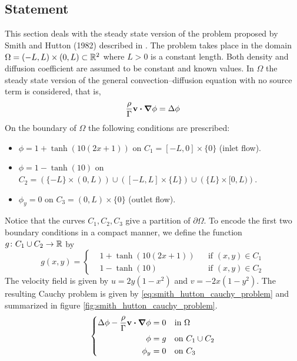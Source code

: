 
\subsection{Statement}

This section deals with the steady state version of the problem proposed by
Smith and Hutton (1982) described in \cite{smith1982numerical}. The problem
takes place in the domain $\Omega = (-L,L) \times (0,L) \subset \mathbb{R}^2$ where
$L > 0$ is a constant length. Both density and diffusion coefficient are assumed
to be constant and known values. In $\Omega$ the steady state version of the
general convection--diffusion equation with no source term is considered, that
is,
\begin{equation*}
	\frac{\rho}{\Gamma} \vb{v} \vdot \grad{\phi} = \Delta{\phi}
\end{equation*}
On the boundary of $\Omega$ the following conditions are prescribed:
\begin{itemize}[topsep=0pt]
	\item $\phi = 1 + \tanh(10(2x+1))$ on $C_1 = [-L,0] \times \{ 0 \}$ (inlet
	flow).
	\item $\phi = 1 - \tanh(10)$ on $C_2 = \left( \{ -L \} \times (0,L) \right)
	\cup \left( [-L,L] \times \{ L \} \right) \cup \left( \{ L \} \times [0,L)
	\right)$.
	\item $\phi_y = 0$ on $C_3 = (0,L) \times \{ 0
	\}$ (outlet flow).
\end{itemize}
Notice that the curves $C_1, C_2, C_3$ give a partition of $\partial \Omega$. To
encode the first two boundary conditions in a compact manner, we define the
function $g \colon C_1 \cup C_2 \rightarrow \mathbb{R}$ by
\begin{equation*}
	g(x,y) = 
	\left\{
	\begin{aligned}
		&1 + \tanh(10(2x + 1)) 	& &\text{if } (x,y) \in C_1 \\
		&1 - \tanh(10) 			& &\text{if } (x,y) \in C_2
	\end{aligned}
	\right.
\end{equation*}
The velocity field is given by $u = 2 y (1 - x^2)$ and $v = -2 x (1 - y^2)$. The
resulting Cauchy problem is given by \eqref{eq:smith_hutton_cauchy_problem} and
summarized in figure \ref{fig:smith_hutton_cauchy_problem}.
\begin{equation} \label{eq:smith_hutton_cauchy_problem} 
	\left\{
	\begin{aligned}
		\Delta \phi - \frac{\rho}{\Gamma} \vb{v} \vdot \grad{\phi} &= 0 &
		&\text{in } \Omega \\
		\phi &= g & 
		&\text{on } C_1 \cup C_2 \\
		\phi_y &= 0 & 
		&\text{on } C_3
	\end{aligned}
	\right.
\end{equation}

